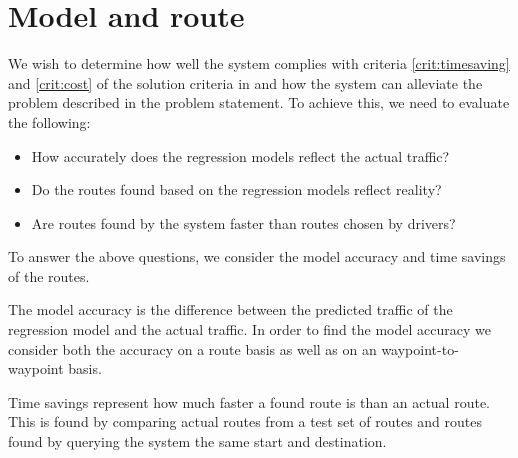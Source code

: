 \section{Model and route}
We wish to determine how well the system complies with criteria \ref{crit:timesaving} and \ref{crit:cost} of the solution criteria in  and how the system can alleviate the problem described in the problem statement. To achieve this, we need to evaluate the following:
\begin{itemize}
\item How accurately does the regression models reflect the actual traffic?
\item Do the routes found based on the regression models reflect reality?
\item Are routes found by the system faster than routes chosen by drivers?
\end{itemize}
To answer the above questions, we consider the model accuracy and time savings of the routes. 

The model accuracy is the difference between the predicted traffic of the regression model and the actual traffic. In order to find the model accuracy we consider both the accuracy on a route basis as well as on an waypoint-to-waypoint basis.

Time savings represent how much faster a found route is than an actual route. This is found by comparing actual routes from a test set of routes and routes found by querying the system the same start and destination.

